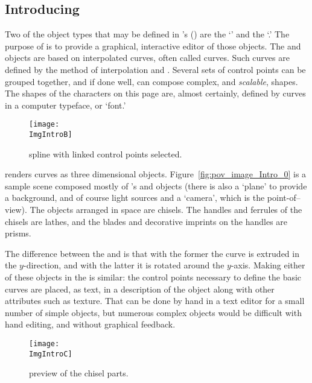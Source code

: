 	\subsection{Introducing \dtypkgu}
	\label{ssec:intro_epspline}
Two of the object types that may be defined in \IXpov's
 ()
are the `\IXprism{}' and the `\IXlathe{}.'
The purpose of \IXpkg{} is to provide a graphical,
interactive editor of those objects. The \IXprism{} and \IXlathe{}
objects are based on interpolated curves, often called
 curves. Such curves are defined by
the method of interpolation and .
Several sets of control points can be grouped together, and
if done well, can compose complex, and \emph{scalable},
shapes.
The shapes of the characters on this page are, almost certainly,
defined by \IXspline{} curves in a computer typeface, or `font.'

\begin{figure}[htb]
\centering
\texttt{[image: \\ImgIntroB]}
\caption{\dtybeznu{} spline with linked control points selected.}
\label{fig:bezier_linked_control_points}
\end{figure}

\IXpov{} renders \IXspline{} curves as three dimensional objects.
Figure~\ref{fig:pov_image_Intro_0} is a sample scene
composed mostly of \IXpov's \IXprism{} and \IXlathe{} objects
(there is also a `plane' to provide a background, and of course
light sources and a `camera', which is the point-of--view).
The objects arranged in space
are chisels. The handles and ferrules of the chisels are
\IXpov{} lathes, and the blades and decorative imprints
on the handles are prisms.

The difference between the \IXprism{} and \IXlathe{} is that
with the former the curve is extruded in the $y$-direction,
and with the latter it is rotated around the $y$-axis.
Making either of these objects in the \IXpov{} 
is similar: the control points necessary to define the
basic curves are placed, as text, in a description of
the object along with other attributes such as texture.
That can be done by hand in a text editor for a small
number of simple objects, but numerous complex objects
would be difficult with hand editing, and
without graphical feedback.

\begin{figure}[htb]
\centering
\texttt{[image: \\ImgIntroC]}
\caption{\dtypov{} preview of the chisel parts.}
\label{fig:chisel_edit_preview_1}
\end{figure}

